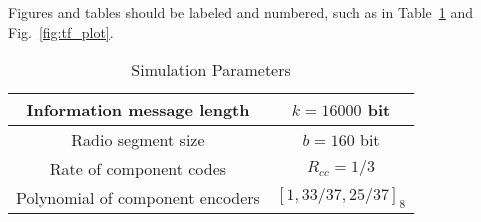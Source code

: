 \documentclass[journal, a4paper]{IEEEtran}
\begin{document}
	Figures and tables should be labeled and numbered, such as in Table~\ref{tab:simParameters} and Fig.~\ref{fig:tf_plot}.

	\begin{table}[!hbt]
		\begin{center}
		\caption{Simulation Parameters}
		\label{tab:simParameters}
		\begin{tabular}{|c|c|}
			\hline
			Information message length & $k=16000$ bit \\
			\hline
			Radio segment size & $b=160$ bit \\
			\hline
			Rate of component codes & $R_{cc}=1/3$\\
			\hline
			Polynomial of component encoders & $[1 , 33/37 , 25/37]_8$\\
			\hline
		\end{tabular}
		\end{center}
	\end{table}


\end{document}
